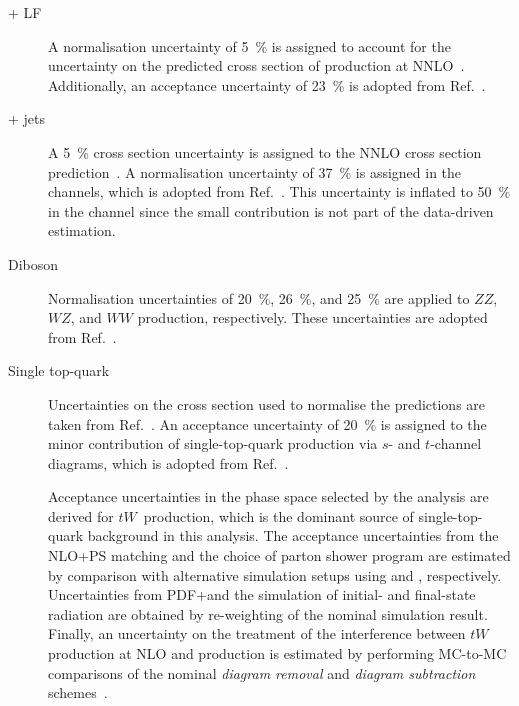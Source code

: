 \begin{description}

\item[\PZ + LF] A normalisation uncertainty of \SI{5}{\percent} is assigned to
  account for the uncertainty on the predicted cross section of \Zjets
  production at NNLO~\cite{Anastasiou:2003ds}. Additionally, an acceptance
  uncertainty of \SI{23}{\percent} is adopted from Ref.~\cite{HIGG-2018-51}.

\item[\PW + jets] A \SI{5}{\percent} cross section uncertainty is assigned to
  the NNLO cross section prediction~\cite{Anastasiou:2003ds}. A normalisation
  uncertainty of \SI{37}{\percent} is assigned in the \lephad channels, which is
  adopted from Ref.~\cite{HIGG-2018-51}. This uncertainty is inflated to
  \SI{50}{\percent} in the \hadhad channel since the small \Wjets contribution
  is not part of the data-driven \faketauhadvisC estimation.

\item[Diboson] Normalisation uncertainties of \SI{20}{\percent},
  \SI{26}{\percent}, and \SI{25}{\percent} are applied to $ZZ$, $WZ$, and $WW$
  production, respectively. These uncertainties are adopted from
  Ref.~\cite{HIGG-2018-51}.

\item[Single top-quark] Uncertainties on the cross section used to normalise the
  predictions are taken from Ref.~\cite{stopxsec}. An acceptance uncertainty of
  \SI{20}{\percent} is assigned to the minor contribution of single-top-quark
  production via $s$- and $t$-channel diagrams, which is adopted from
  Ref.~\cite{HIGG-2018-51}.

  Acceptance uncertainties in the phase space selected by the analysis are
  derived for $tW$~production, which is the dominant source of single-top-quark
  background in this analysis. The acceptance uncertainties from the NLO+PS
  matching and the choice of parton shower program are estimated by comparison
  with alternative simulation setups using \MGNLO and \HERWIG[7],
  respectively. Uncertainties from PDF+\alphas and the simulation of initial-
  and final-state radiation are obtained by re-weighting of the nominal
  simulation result. Finally, an uncertainty on the treatment of the
  interference between $tW$ production at NLO and \ttbar production is estimated
  by performing MC-to-MC comparisons of the nominal \emph{diagram removal} and
  \emph{diagram subtraction} schemes~\cite{Frixione:2008yi}.


\end{description}
